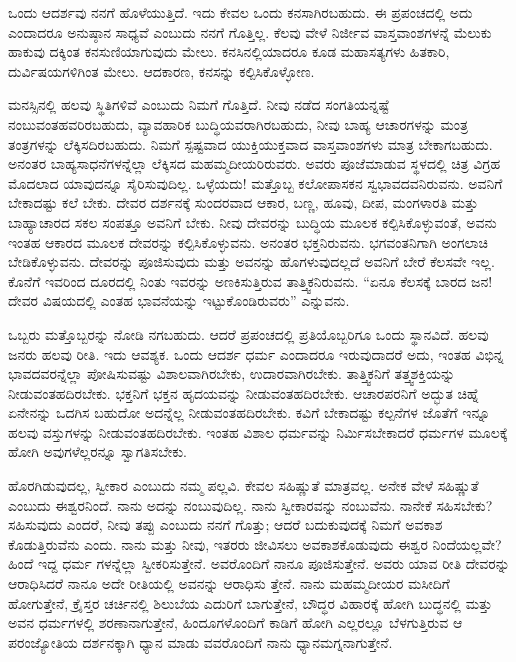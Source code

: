 ಒಂದು ಆದರ್ಶವು ನನಗೆ ಹೊಳೆಯುತ್ತಿದೆ. ಇದು ಕೇವಲ ಒಂದು ಕನಸಾಗಿರಬಹುದು. ಈ ಪ್ರಪಂಚದಲ್ಲಿ ಅದು ಎಂದಾದರೂ ಅನುಷ್ಠಾನ ಸಾಧ್ಯವೆ ಎಂಬುದು ನನಗೆ ಗೊತ್ತಿಲ್ಲ. ಕೆಲವು ವೇಳೆ ನಿರ್ಜೀವ ವಾಸ್ತವಾಂಶಗಳನ್ನೆ ಮೆಲುಕು ಹಾಕುವು ದಕ್ಕಿಂತ ಕನಸುಣಿಯಾಗುವುದು ಮೇಲು. ಕನಸಿನಲ್ಲಿಯಾದರೂ ಕೂಡ ಮಹಾಸತ್ಯಗಳು ಹಿತಕಾರಿ, ದುರ್ವಿಷಯಗಳಿಗಿಂತ ಮೇಲು. ಆದಕಾರಣ, ಕನಸನ್ನು ಕಲ್ಪಿಸಿಕೊಳ್ಳೋಣ.

ಮನಸ್ಸಿನಲ್ಲಿ ಹಲವು ಸ್ಥಿತಿಗಳಿವೆ ಎಂಬುದು ನಿಮಗೆ ಗೊತ್ತಿದೆ. ನೀವು ನಡೆದ ಸಂಗತಿಯನ್ನಷ್ಟೆ ನಂಬುವಂತಹವರಿರಬಹುದು, ವ್ಯಾವಹಾರಿಕ ಬುದ್ಧಿಯವರಾಗಿರಬಹುದು, ನೀವು ಬಾಹ್ಯ ಆಚಾರಗಳನ್ನು ಮಂತ್ರ ತಂತ್ರಗಳನ್ನು ಲೆಕ್ಕಿಸದಿರಬಹುದು. ನಿಮಗೆ ಸ್ಪಷ್ಟವಾದ ಯುಕ್ತಿಯುಕ್ತವಾದ ವಾಸ್ತವಾಂಶಗಳು ಮಾತ್ರ ಬೇಕಾಗಬಹುದು. ಅನಂತರ ಬಾಹ್ಯಸಾಧನೆಗಳನ್ನೆಲ್ಲಾ ಲೆಕ್ಕಿಸದ ಮಹಮ್ಮದೀಯರಿರುವರು. ಅವರು ಪೂಜೆಮಾಡುವ ಸ್ಥಳದಲ್ಲಿ ಚಿತ್ರ ವಿಗ್ರಹ ಮೊದಲಾದ ಯಾವುದನ್ನೂ ಸೈರಿಸುವುದಿಲ್ಲ. ಒಳ್ಳೆಯದು! ಮತ್ತೊಬ್ಬ ಕಲೋಪಾಸಕನ ಸ್ವಭಾವದವನಿರುವನು. ಅವನಿಗೆ ಬೇಕಾದಷ್ಟು ಕಲೆ ಬೇಕು. ದೇವರ ದರ್ಶನಕ್ಕೆ ಸುಂದರವಾದ ಆಕಾರ, ಬಣ್ಣ, ಹೂವು, ದೀಪ, ಮಂಗಳಾರತಿ ಮತ್ತು ಬಾಹ್ಯಾಚಾರದ ಸಕಲ ಸಂಪತ್ತೂ ಅವನಿಗೆ ಬೇಕು. ನೀವು ದೇವರನ್ನು ಬುದ್ಧಿಯ ಮೂಲಕ ಕಲ್ಪಿಸಿಕೊಳ್ಳುವಂತೆ, ಅವನು ಇಂತಹ ಆಕಾರದ ಮೂಲಕ ದೇವರನ್ನು ಕಲ್ಪಿಸಿಕೊಳ್ಳುವನು. ಅನಂತರ ಭಕ್ತನಿರುವನು. ಭಗವಂತನಿಗಾಗಿ ಅಂಗಲಾಚಿ ಬೇಡಿಕೊಳ್ಳುವನು. ದೇವರನ್ನು ಪೂಜಿಸುವುದು ಮತ್ತು ಅವನನ್ನು ಹೊಗಳುವುದಲ್ಲದೆ ಅವನಿಗೆ ಬೇರೆ ಕೆಲಸವೇ ಇಲ್ಲ. ಕೊನೆಗೆ ಇವರಿಂದ ದೂರದಲ್ಲಿ ನಿಂತು ಇವರನ್ನು ಅಣಕಿಸುತ್ತಿರುವ ತಾತ್ತ್ವಿಕನಿರುವನು. “ಏನೂ ಕೆಲಸಕ್ಕೆ ಬಾರದ ಜನ! ದೇವರ ವಿಷಯದಲ್ಲಿ ಎಂತಹ ಭಾವನೆಯನ್ನು ಇಟ್ಟುಕೊಂಡಿರುವರು” ಎನ್ನುವನು.

ಒಬ್ಬರು ಮತ್ತೊಬ್ಬರನ್ನು ನೋಡಿ ನಗಬಹುದು. ಆದರೆ ಪ್ರಪಂಚದಲ್ಲಿ ಪ್ರತಿಯೊಬ್ಬರಿಗೂ ಒಂದು ಸ್ಥಾನವಿದೆ. ಹಲವು ಜನರು ಹಲವು ರೀತಿ. ಇದು ಆವಶ್ಯಕ. ಒಂದು ಆದರ್ಶ ಧರ್ಮ ಎಂದಾದರೂ ಇರುವುದಾದರೆ ಅದು, ಇಂತಹ ವಿಭಿನ್ನ ಭಾವದವರನ್ನೆಲ್ಲಾ ಪೋಷಿಸುವಷ್ಟು ವಿಶಾಲವಾಗಿರಬೇಕು, ಉದಾರವಾಗಿರಬೇಕು. ತಾತ್ತ್ವಿಕನಿಗೆ ತತ್ತ್ವಶಕ್ತಿಯನ್ನು ನೀಡುವಂತಹದಿರಬೇಕು. ಭಕ್ತನಿಗೆ ಭಕ್ತನ ಹೃದಯವನ್ನು ನೀಡುವಂತಹದಿರಬೇಕು. ಆಚಾರಪರನಿಗೆ ಅದ್ಭುತ ಚಿಹ್ನೆ ಏನೇನನ್ನು ಒದಗಿಸ ಬಹುದೋ ಅದನ್ನೆಲ್ಲ ನೀಡುವಂತಹದಿರಬೇಕು. ಕವಿಗೆ ಬೇಕಾದಷ್ಟು ಕಲ್ಪನೆಗಳ ಜೊತೆಗೆ ಇನ್ನೂ ಹಲವು ವಸ್ತುಗಳನ್ನು ನೀಡುವಂತಹದಿರಬೇಕು. ಇಂತಹ ವಿಶಾಲ ಧರ್ಮವನ್ನು ನಿರ್ಮಿಸಬೇಕಾದರೆ ಧರ್ಮಗಳ ಮೂಲಕ್ಕೆ ಹೋಗಿ ಅವುಗಳೆಲ್ಲರನ್ನೂ ಸ್ವಾಗತಿಸಬೇಕು.

ಹೊರಗಿಡುವುದಲ್ಲ, ಸ್ವೀಕಾರ ಎಂಬುದು ನಮ್ಮ ಪಲ್ಲವಿ. ಕೇವಲ ಸಹಿಷ್ಣುತೆ ಮಾತ್ರವಲ್ಲ. ಅನೇಕ ವೇಳೆ ಸಹಿಷ್ಣುತೆ ಎಂಬುದು ಈಶ್ವರನಿಂದೆ. ನಾನು ಅದನ್ನು ನಂಬುವುದಿಲ್ಲ. ನಾನು ಸ್ವೀಕಾರವನ್ನು ನಂಬುವೆನು. ನಾನೇಕೆ ಸಹಿಸಬೇಕು? ಸಹಿಸುವುದು ಎಂದರೆ, ನೀವು ತಪ್ಪು ಎಂಬುದು ನನಗೆ ಗೊತ್ತು; ಆದರೆ ಬದುಕುವುದಕ್ಕೆ ನಿಮಗೆ ಅವಕಾಶ ಕೊಡುತ್ತಿರುವೆನು ಎಂದು. ನಾನು ಮತ್ತು ನೀವು, ಇತರರು ಜೀವಿಸಲು ಅವಕಾಶಕೊಡುವುದು ಈಶ್ವರ ನಿಂದೆಯಲ್ಲವೇ? ಹಿಂದೆ ಇದ್ದ ಧರ್ಮ ಗಳನ್ನೆಲ್ಲಾ ಸ್ವೀಕರಿಸುತ್ತೇನೆ. ಅವರೊಂದಿಗೆ ನಾನೂ ಪೂಜಿಸುತ್ತೇನೆ. ಅವರು ಯಾವ ರೀತಿ ದೇವರನ್ನು ಆರಾಧಿಸಿದರೆ ನಾನೂ ಅದೇ ರೀತಿಯಲ್ಲಿ ಅವನನ್ನು ಆರಾಧಿಸು ತ್ತೇನೆ. ನಾನು ಮಹಮ್ಮದೀಯರ ಮಸೀದಿಗೆ ಹೋಗುತ್ತೇನೆ, ಕ್ರೈಸ್ತರ ಚರ್ಚಿನಲ್ಲಿ ಶಿಲುಬೆಯ ಎದುರಿಗೆ ಬಾಗುತ್ತೇನೆ, ಬೌದ್ಧರ ವಿಹಾರಕ್ಕೆ ಹೋಗಿ ಬುದ್ಧನಲ್ಲಿ ಮತ್ತು ಅವನ ಧರ್ಮಗಳಲ್ಲಿ ಶರಣಾನಾಗುತ್ತೇನೆ, ಹಿಂದೂಗಳೊಂದಿಗೆ ಕಾಡಿಗೆ ಹೋಗಿ ಎಲ್ಲರಲ್ಲೂ ಬೆಳಗುತ್ತಿರುವ ಆ ಪರಂಜ್ಯೋತಿಯ ದರ್ಶನಕ್ಕಾಗಿ ಧ್ಯಾನ ಮಾಡು ವವರೊಂದಿಗೆ ನಾನು ಧ್ಯಾನಮಗ್ನನಾಗುತ್ತೇನೆ.

